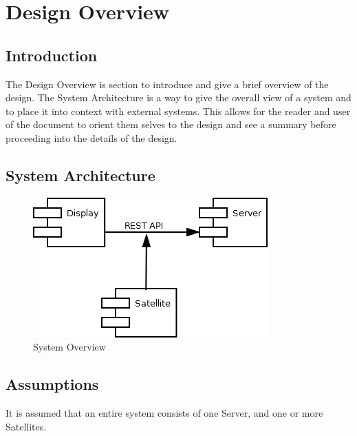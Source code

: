 \chapter{Design Overview}

\section{Introduction}
The Design Overview is section to introduce and give a brief overview of the design.  The System
Architecture is a way to give the overall view of a system and to place it into context with external
systems.  This allows for the reader and user of the document to orient them selves to the design and
see a summary before proceeding into the details of the design.

\section{System Architecture}
\begin{figure}[H]
\centering
\includegraphics[scale=0.7]{Software/images/SystemOverviewDiagram.png}
\caption{System Overview}
\label{SystemOverview}
\end{figure}

\section{Assumptions}
It is assumed that an entire system consists of one Server, and one or more Satellites.